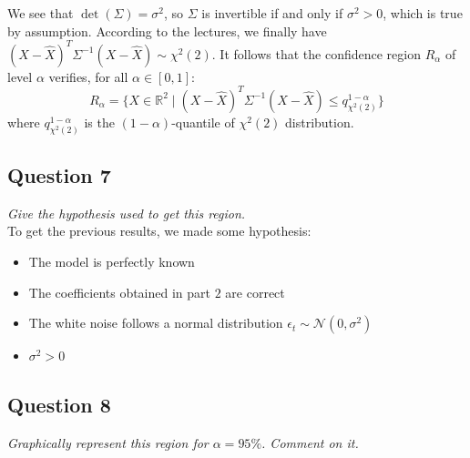 \documentclass[]{article}
\begin{document}
We see that $\det(\Sigma) = \sigma^2$, so $\Sigma$ is invertible if and only if $\sigma^2>0$, which is true by assumption.
According to the lectures, we finally have $(X-\hat{X})^T\Sigma^{-1}(X-\hat{X}) \sim \chi^2(2)$. It follows that the confidence region $R_{\alpha}$ of level $\alpha$ verifies, for all $\alpha\in [0,1]$:
\begin{equation}
	R_{\alpha} = \{X\in \mathbb{R}^2\mid (X-\hat{X})^T\Sigma^{-1}(X-\hat{X}) \leq q_{\chi^2(2)}^{1-\alpha}\}
\end{equation}
where $q_{\chi^2(2)}^{1-\alpha}$ is the $(1-\alpha)$-quantile of $\chi^2(2)$ distribution.
\subsection{Question 7}
\textit{Give the hypothesis used to get this region.}\\

To get the previous results, we made some hypothesis:
\begin{itemize}
	\item The model is perfectly known
	\item The coefficients obtained in part $2$ are correct
	\item The white noise follows a normal distribution $\epsilon_t \sim \mathcal{N}(0, \sigma^2)$
	\item $\sigma^2 > 0$
\end{itemize}

\subsection{Question 8}
\textit{Graphically represent this region for $\alpha = 95\%$. Comment on it.}\\
\end{document}
